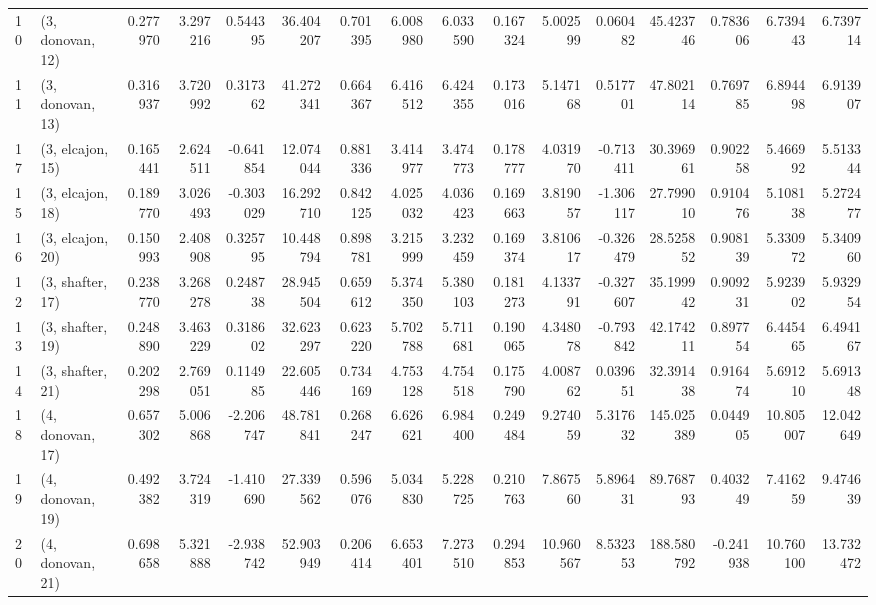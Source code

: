 \begin{tabular}{llrrrrrrrrrrrrrr}
10 &  (3, donovan, 12) &   0.277970 &  3.297216 &  0.544395 &  36.404207 &  0.701395 &   6.008980 &  6.033590 &  0.167324 &   5.002599 &  0.060482 &   45.423746 &  0.783606 &   6.739443 &   6.739714 \\
11 &  (3, donovan, 13) &   0.316937 &  3.720992 &  0.317362 &  41.272341 &  0.664367 &   6.416512 &  6.424355 &  0.173016 &   5.147168 &  0.517701 &   47.802114 &  0.769785 &   6.894498 &   6.913907 \\
17 &  (3, elcajon, 15) &   0.165441 &  2.624511 & -0.641854 &  12.074044 &  0.881336 &   3.414977 &  3.474773 &  0.178777 &   4.031970 & -0.713411 &   30.396961 &  0.902258 &   5.466992 &   5.513344 \\
15 &  (3, elcajon, 18) &   0.189770 &  3.026493 & -0.303029 &  16.292710 &  0.842125 &   4.025032 &  4.036423 &  0.169663 &   3.819057 & -1.306117 &   27.799010 &  0.910476 &   5.108138 &   5.272477 \\
16 &  (3, elcajon, 20) &   0.150993 &  2.408908 &  0.325795 &  10.448794 &  0.898781 &   3.215999 &  3.232459 &  0.169374 &   3.810617 & -0.326479 &   28.525852 &  0.908139 &   5.330972 &   5.340960 \\
12 &  (3, shafter, 17) &   0.238770 &  3.268278 &  0.248738 &  28.945504 &  0.659612 &   5.374350 &  5.380103 &  0.181273 &   4.133791 & -0.327607 &   35.199942 &  0.909231 &   5.923902 &   5.932954 \\
13 &  (3, shafter, 19) &   0.248890 &  3.463229 &  0.318602 &  32.623297 &  0.623220 &   5.702788 &  5.711681 &  0.190065 &   4.348078 & -0.793842 &   42.174211 &  0.897754 &   6.445465 &   6.494167 \\
14 &  (3, shafter, 21) &   0.202298 &  2.769051 &  0.114985 &  22.605446 &  0.734169 &   4.753128 &  4.754518 &  0.175790 &   4.008762 &  0.039651 &   32.391438 &  0.916474 &   5.691210 &   5.691348 \\
18 &  (4, donovan, 17) &   0.657302 &  5.006868 & -2.206747 &  48.781841 &  0.268247 &   6.626621 &  6.984400 &  0.249484 &   9.274059 &  5.317632 &  145.025389 &  0.044905 &  10.805007 &  12.042649 \\
19 &  (4, donovan, 19) &   0.492382 &  3.724319 & -1.410690 &  27.339562 &  0.596076 &   5.034830 &  5.228725 &  0.210763 &   7.867560 &  5.896431 &   89.768793 &  0.403249 &   7.416259 &   9.474639 \\
20 &  (4, donovan, 21) &   0.698658 &  5.321888 & -2.938742 &  52.903949 &  0.206414 &   6.653401 &  7.273510 &  0.294853 &  10.960567 &  8.532353 &  188.580792 & -0.241938 &  10.760100 &  13.732472 \\

\end{tabular}
